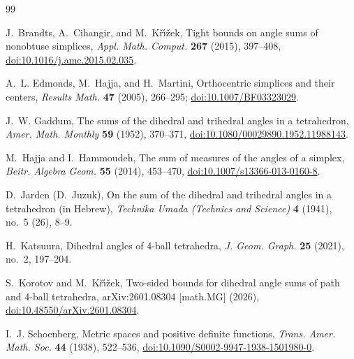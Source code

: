 \documentclass[11pt,a4paper]{article}
\theoremstyle{definition}
\theoremstyle{remark}
\begin{document}
\begin{thebibliography}{99}
\small
\setlength{\itemsep}{4pt}

J.~Brandts, A.~Cihangir, and M.~K\v{r}\'\i\v{z}ek,
\newblock Tight bounds on angle sums of nonobtuse simplices,
\newblock \emph{Appl. Math. Comput.} \textbf{267} (2015), 397--408,
\newblock \href{https://doi.org/10.1016/j.amc.2015.02.035}
{doi:10.1016/j.amc.2015.02.035}.

A.~L. Edmonds, M.~Hajja, and H.~Martini,
\newblock Orthocentric simplices and their centers,
\newblock \emph{Results Math.} \textbf{47} (2005), 266--295;
\newblock \href{https://doi.org/10.1007/BF03323029}
{doi:10.1007/BF03323029}.

J.~W. Gaddum,
\newblock The sums of the dihedral and trihedral angles in a tetrahedron,
\newblock \emph{Amer. Math. Monthly} \textbf{59} (1952), 370--371,
\newblock \href{https://doi.org/10.1080/00029890.1952.11988143}
{doi:10.1080/00029890.1952.11988143}.

M.~Hajja and I.~Hammoudeh,
\newblock The sum of measures of the angles of a simplex,
\newblock \emph{Beitr. Algebra Geom.} \textbf{55} (2014), 453--470,
\newblock \href{https://doi.org/10.1007/s13366-013-0160-8}
{doi:10.1007/s13366-013-0160-8}.

D.~Jarden (D.~Juzuk),
\newblock On the sum of the dihedral and trihedral angles in a tetrahedron
(in Hebrew),
\newblock \emph{Technika Umada (Technics and Science)} \textbf{4} (1941),
no.~5 (26), 8--9.

H.~Katsuura,
\newblock Dihedral angles of 4-ball tetrahedra,
\newblock \emph{J. Geom. Graph.} \textbf{25} (2021), no.~2, 197--204.

S.~Korotov and M.~K\v{r}\'\i\v{z}ek,
\newblock Two-sided bounds for dihedral angle sums of path and 4-ball
tetrahedra,
\newblock arXiv:2601.08304 [math.MG] (2026),
\newblock \href{https://doi.org/10.48550/arXiv.2601.08304}
{doi:10.48550/arXiv.2601.08304}.

I.~J. Schoenberg,
\newblock Metric spaces and positive definite functions,
\newblock \emph{Trans. Amer. Math. Soc.} \textbf{44} (1938), 522--536,
\newblock \href{https://doi.org/10.1090/S0002-9947-1938-1501980-0}
{doi:10.1090/S0002-9947-1938-1501980-0}.

\end{thebibliography}
\end{document}
